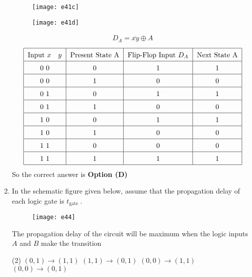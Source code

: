 \begin{enumerate}
\begin{tasks}
\begin{figure}[H]
\end{figure}
\task[\textbf{C.}] \begin{figure}[H]
	\centering
	\texttt{[image: e41c]}
\end{figure}
\task[\textbf{D.}] \begin{figure}[H]
	\centering
	\texttt{[image: e41d]}
\end{figure}
\end{tasks}
\begin{answer}
\begin{align*}
D_{A}=\overline{x y} \oplus A
\end{align*}
\begin{align*}
\renewcommand*{\arraystretch}{1.5}
\begin{tabular}{|c|c|c|c|}
\hline
Input
$x \quad y$&Present
State A&Flip-Flop
Input $D_{A}$&Next State
$\mathrm{A}$\\
\hline
0 0&0&1&1\\
\hline
0 0&1&0&0\\
\hline
0 1&0&1&1\\
\hline
0 1&1&0&0\\
\hline
1 0&0&1&1\\
\hline
1 0& 1& 0&0\\
\hline
1 1&0&0&0\\
\hline
1 1&1&1&1\\
\hline
\end{tabular}
\end{align*}
So the correct answer is \textbf{Option (D)}
\end{answer}
	\item In the schematic figure given below, assume that the propagation delay of each logic gate is $t_{\text {gate }}$.\\
	\begin{figure}[H]
		\centering
		\texttt{[image: e44]}
	\end{figure}
	The propagation delay of the circuit will be maximum when the logic inputs $A$ and $B$ make the transition
	{}
\begin{tasks}(2)
\task[\textbf{A.}] $(0,1) \rightarrow(1,1)$
\task[\textbf{B.}] $(1,1) \rightarrow(0,1)$
\task[\textbf{C.}] $(0,0) \rightarrow(1,1)$
\task[\textbf{D.}] 	$(0,0) \rightarrow(0,1)$
\end{tasks}
\begin{answer}$\left. \right. $
\begin{table}[H]
	\centering
	\renewcommand*{\arraystretch}{1.2}

\end{table}
\end{answer}
\end{enumerate}

